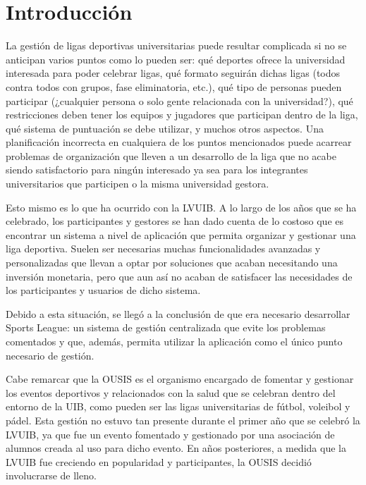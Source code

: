 
\chapter{Introducción}
\label{ch:intro}

La gestión de ligas deportivas universitarias puede resultar complicada si no se anticipan varios puntos como lo pueden ser: qué deportes ofrece la universidad interesada para poder celebrar ligas, qué formato seguirán dichas ligas (todos contra todos con grupos, fase eliminatoria, etc.), qué tipo de personas pueden participar (¿cualquier persona o solo gente relacionada con la universidad?), qué restricciones deben tener los equipos y jugadores que participan dentro de la liga, qué sistema de puntuación se debe utilizar, y muchos otros aspectos. Una planificación incorrecta en cualquiera de los puntos mencionados puede acarrear problemas de organización que lleven a un desarrollo de la liga que no acabe siendo satisfactorio para ningún interesado ya sea para los integrantes universitarios que participen o la misma universidad gestora.

Esto mismo es lo que ha ocurrido con la \ac{LVUIB}. A lo largo de los años que se ha celebrado, los participantes y gestores se han dado cuenta de lo costoso que es encontrar un sistema a nivel de aplicación que permita organizar y gestionar una liga deportiva. Suelen ser necesarias muchas funcionalidades avanzadas y personalizadas que llevan a optar por soluciones que acaban necesitando una inversión monetaria, pero que aun así no acaban de satisfacer las necesidades de los participantes y usuarios de dicho sistema.

Debido a esta situación, se llegó a la conclusión de que era necesario desarrollar Sports League: un sistema de gestión centralizada que evite los problemas comentados y que, además, permita utilizar la aplicación como el único punto necesario de gestión.

Cabe remarcar que la \ac{OUSIS} es el organismo encargado de fomentar y gestionar los eventos deportivos y relacionados con la salud que se celebran dentro del entorno de la \ac{UIB}, como pueden ser las ligas universitarias de fútbol, voleibol y pádel. Esta gestión no estuvo tan presente durante el primer año que se celebró la \ac{LVUIB}, ya que fue un evento fomentado y gestionado por una asociación de alumnos creada al uso para dicho evento. En años posteriores, a medida que la \ac{LVUIB} fue creciendo en popularidad y participantes, la \ac{OUSIS} decidió involucrarse de lleno.

